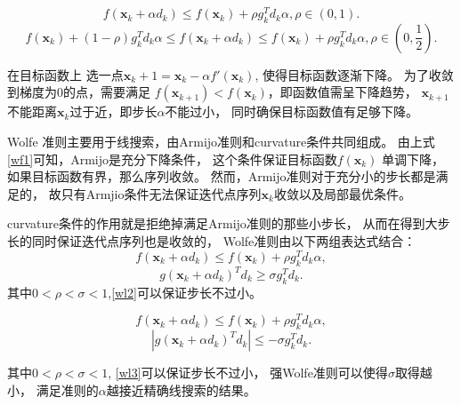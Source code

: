 \begin{definition}\cite{1980Curvilinear}
    \begin{equation}\label{wf1}
        f(\bm{x}_k+\alpha d_k) \leq f(\bm{x}_k) + \rho g_k^Td_k\alpha, \rho\in(0,1).
    \end{equation}
    \begin{equation}
        f(\bm{x}_k) + (1 - \rho) g_k^Td_k\alpha \leq 
        f(\bm{x}_k+\alpha d_k) \leq 
        f(\bm{x}_k) + \rho g_k^Td_k\alpha, 
        \rho\in(0,\displaystyle\frac{1}{2}).
    \end{equation}

    在目标函数上
    选一点$\bm{x}_k+1=\bm{x}_k−\alpha f′(\bm{x}_k)$, 
    使得目标函数逐渐下降。
    为了收敛到梯度为0的点，需要满足
    $f(\bm{x}_{k+1})<f(\bm{x}_k)$，即函数值需呈下降趋势，
    $\bm{x}_{k+1}$不能距离$\bm{x}_k$过于近，即步长$\alpha$不能过小，
    同时确保目标函数值有足够下降。
\end{definition}

\begin{definition}[Wolfe准则]

    Wolfe 准则主要用于线搜索，由Armijo准则和curvature条件共同组成。
    由上式\eqref{wf1}可知，Armijo是充分下降条件，
    这个条件保证目标函数$f(\bm{x}_k)$ 单调下降，
    如果目标函数有界，那么序列收敛。
    然而，Armijo准则对于充分小的步长都是满足的，
    故只有Armjio条件无法保证迭代点序列$\bm{x}_k$收敛以及局部最优条件。

    curvature条件的作用就是拒绝掉满足Armijo准则的那些小步长，
    从而在得到大步长的同时保证迭代点序列也是收敛的，
    Wolfe准则由以下两组表达式结合：
    \begin{equation}
        f(\bm{x}_k+\alpha d_k) \leq f(\bm{x}_k) + \rho g_k^Td_k\alpha,
    \end{equation}
    \begin{equation}\label{wl2}
        g(\bm{x}_k+\alpha d_k)^Td_k \geq \sigma g_k^Td_k.
    \end{equation}
    其中$0 < \rho < \sigma < 1$,\eqref{wl2}可以保证步长不过小。
\end{definition}

\begin{definition}[强Wolfe准则]
    \begin{equation}
        f(\bm{x}_k+\alpha d_k) \leq f(\bm{x}_k) + \rho g_k^Td_k\alpha,
    \end{equation}
    \begin{equation}\label{wl3}
        |g(\bm{x}_k+\alpha d_k)^Td_k| \leq -\sigma g_k^Td_k.
    \end{equation}
    
    其中$0 < \rho < \sigma < 1$, \eqref{wl3}可以保证步长不过小，
    强Wolfe准则可以使得$\sigma$取得越小，
    满足准则的$\alpha$越接近精确线搜索的结果。
\end{definition}

